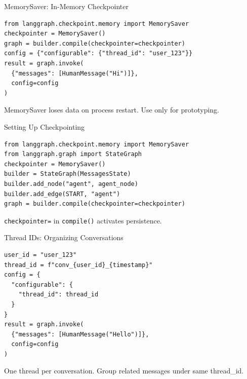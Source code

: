 \documentclass[aspectratio=169,11pt]{beamer}
\begin{document}
\begin{frame}[fragile]{MemorySaver: In-Memory Checkpointer}
  \begin{codebox}
    \begin{lstlisting}
from langgraph.checkpoint.memory import MemorySaver
checkpointer = MemorySaver()
graph = builder.compile(checkpointer=checkpointer)
config = {"configurable": {"thread_id": "user_123"}}
result = graph.invoke(
  {"messages": [HumanMessage("Hi")]},
  config=config
)
    \end{lstlisting}
  \end{codebox}
  \vspace{0.1cm}
  \begin{warningbox}
    MemorySaver loses data on process restart. Use only for prototyping.
  \end{warningbox}
\end{frame}

\begin{frame}[fragile]{Setting Up Checkpointing}
  \begin{codebox}
    \begin{lstlisting}
from langgraph.checkpoint.memory import MemorySaver
from langgraph.graph import StateGraph
checkpointer = MemorySaver()
builder = StateGraph(MessagesState)
builder.add_node("agent", agent_node)
builder.add_edge(START, "agent")
graph = builder.compile(checkpointer=checkpointer)
    \end{lstlisting}
  \end{codebox}
  \vspace{0.1cm}
  \begin{tipbox}
    \texttt{checkpointer=} in \texttt{compile()} activates persistence.
  \end{tipbox}
\end{frame}

\begin{frame}[fragile]{Thread IDs: Organizing Conversations}
  \begin{codebox}
    \begin{lstlisting}
user_id = "user_123"
thread_id = f"conv_{user_id}_{timestamp}"
config = {
  "configurable": {
    "thread_id": thread_id
  }
}
result = graph.invoke(
  {"messages": [HumanMessage("Hello")]},
  config=config
)
    \end{lstlisting}
  \end{codebox}
  \vspace{0.1cm}
  \begin{tipbox}
    One thread per conversation. Group related messages under same thread\_id.
  \end{tipbox}
\end{frame}
\end{document}

